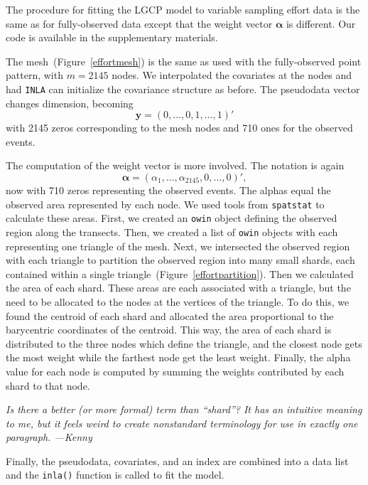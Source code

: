 \documentclass[]{interact}
\begin{document}
The procedure for fitting the LGCP model to variable sampling effort data is
the same as for fully-observed data except that the weight vector
\(\boldsymbol{\alpha}\) is different. Our code is available in the
supplementary materials.

The mesh~(Figure~\ref{effortmesh}) is the same as used with the fully-observed
point pattern, with \(m = 2145\) nodes. We interpolated the covariates
at the nodes and had \texttt{INLA} can initialize the covariance structure as
before. The pseudodata vector changes dimension, becoming
\begin{displaymath}
\mathbf{y} = (0, \dots, 0, 1, \dots, 1)'
\end{displaymath}
with 2145 zeros corresponding to the mesh nodes and 710 ones for the observed
events.

The computation of the weight vector is more involved. The notation is again
\begin{displaymath}
\boldsymbol{\alpha} = (\alpha_{1}, \dots, \alpha_{2145}, 0, \dots, 0)',
\end{displaymath}
now with 710 zeros representing the observed events. The alphas equal the
observed area represented by each node. We used tools from \texttt{spatstat}
to calculate these areas. First, we created an \texttt{owin} object defining
the observed region along the transects. Then, we created a list of
\texttt{owin} objects with each representing one triangle of the mesh. Next,
we intersected the observed region with each triangle to partition the observed
region into many small shards, each contained within a single
triangle~(Figure~\ref{effortpartition}). Then we calculated the area of each
shard. These areas are each associated with a triangle, but the need to be
allocated to the nodes at the vertices of the triangle. To do this, we found
the centroid of each shard and allocated the area proportional to the
barycentric coordinates of the centroid. This way, the area of each shard is
distributed to the three nodes which define the triangle, and the closest node
gets the most weight while the farthest node get the least weight. Finally,
the alpha value for each node is computed by summing the weights contributed
by each shard to that node.

{\it Is there a better (or more formal) term than ``shard''? It has an
intuitive meaning to me, but it feels weird to create nonstandard terminology
for use in exactly one paragraph. ---Kenny}

Finally, the pseudodata, covariates, and an index are combined into a data
list and the \texttt{inla()} function is called to fit the model.
\end{document}
